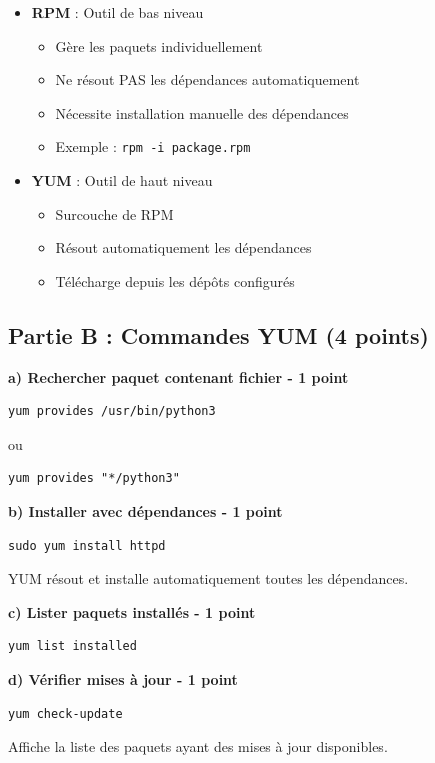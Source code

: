 \documentclass[12pt,a4paper]{article}
\begin{document}
\begin{answerbox}
\begin{itemize}
    \item \textbf{RPM} : Outil de bas niveau
    \begin{itemize}
        \item Gère les paquets individuellement
        \item Ne résout PAS les dépendances automatiquement
        \item Nécessite installation manuelle des dépendances
        \item Exemple : \texttt{rpm -i package.rpm}
    \end{itemize}
    \item \textbf{YUM} : Outil de haut niveau
    \begin{itemize}
        \item Surcouche de RPM
        \item Résout automatiquement les dépendances
        \item Télécharge depuis les dépôts configurés
    \end{itemize}
\end{itemize}
\end{answerbox}

\subsection*{Partie B : Commandes YUM (4 points)}

\begin{answerbox}
\textbf{a) Rechercher paquet contenant fichier - 1 point}

\begin{lstlisting}
yum provides /usr/bin/python3
\end{lstlisting}

ou

\begin{lstlisting}
yum provides "*/python3"
\end{lstlisting}

\textbf{b) Installer avec dépendances - 1 point}

\begin{lstlisting}
sudo yum install httpd
\end{lstlisting}

YUM résout et installe automatiquement toutes les dépendances.

\textbf{c) Lister paquets installés - 1 point}

\begin{lstlisting}
yum list installed
\end{lstlisting}

\textbf{d) Vérifier mises à jour - 1 point}

\begin{lstlisting}
yum check-update
\end{lstlisting}

Affiche la liste des paquets ayant des mises à jour disponibles.
\end{answerbox}
\end{document}

